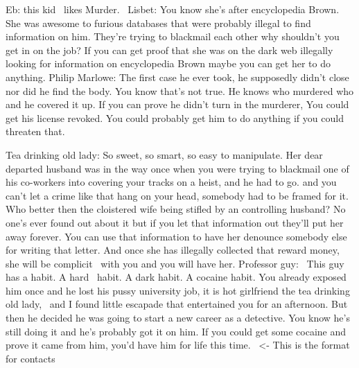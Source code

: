 \documentclass[char]{GC2019}
\begin{document}
\begin{itemz}[Notes]
	\item 
\end{itemz}

\begin{contacts}
Eb: this kid  likes Murder. 
Lisbet: You know she's after encyclopedia Brown. She was awesome to furious databases that were probably illegal to find information on him. They're trying to blackmail each other why shouldn't you get in on the job? If you can get proof that she was on the dark web illegally looking for information on encyclopedia Brown maybe you can get her to do anything.
Philip Marlowe: The first case he ever took, he supposedly didn't close nor did he find the body. You know that's not true. He knows who murdered who and he covered it up. If you can prove he didn't turn in the murderer, You could get his license revoked. You could probably get him to do anything if you could threaten that.
	
  Tea drinking old lady: So sweet, so smart, so easy to manipulate. Her dear  departed husband was in the way once when you were trying to blackmail one of his co-workers into covering your tracks on a heist, and he had to go. and you can't let a crime like that hang on your head, somebody had to be framed for it. Who better then the cloistered wife being stifled by an controlling husband? No one's ever found out about it but if you let that information out they'll put her away forever. You can use that information to have her denounce somebody else for writing that letter. And once she has illegally collected that reward money,  she will be complicit  with you and you will have her.
  Professor guy:  This guy has a habit. A hard  habit. A dark habit. A cocaine habit. You already exposed him once and he lost his pussy university job, it is hot girlfriend the tea drinking old lady,  and I found little escapade that entertained you for an afternoon. But then he decided he was going to start a new career as a detective. You know he's still doing it and he's probably got it on him. If you could get some cocaine and prove it came from him, you'd have him for life this time. 
  \contact{\cTest{}} <- This is the format for contacts 
\end{contacts}
\end{document}
